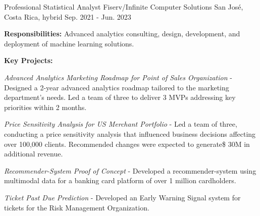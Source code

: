 \begin{cventries}
  \cventry
    {Professional Statistical Analyst} %
    {Fiserv/Infinite Computer Solutions} %
    {San José, Costa Rica, hybrid} %
    {Sep. 2021 - Jun. 2023} %
    {
      \begin{cvitems} %
        \item {\textbf{Responsibilities:} Advanced analytics consulting, design, development, and deployment of machine learning solutions.}
        \item {\textbf{Key Projects:}}
        \item {\textit{Advanced Analytics Marketing Roadmap for Point of Sales Organization} - Designed a 2-year advanced analytics roadmap tailored to the marketing department’s needs. Led a team of three to deliver 3 MVPs addressing key priorities within 2 months.}
        \item {\textit{Price Sensitivity Analysis for US Merchant Portfolio} - Led a team of three, conducting a price sensitivity analysis that influenced business decisions affecting over 100,000 clients. Recommended changes were expected to generate\$ 30M in additional revenue.}
        \item {\textit{Recommender-System Proof of Concept} - Developed a recommender-system using multimodal data for a banking card platform of over 1 million cardholders.}
        \item {\textit{Ticket Past Due Prediction} - Developed an Early Warning Signal system for tickets for the Risk Management Organization.}
      \end{cvitems}
    }


\end{cventries}
